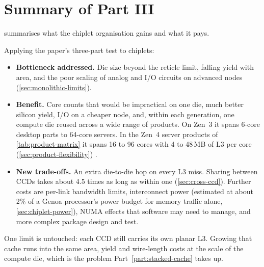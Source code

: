 \section{Summary of Part III}
 summarises what the chiplet organisation gains and what it pays.



Applying the paper's three-part test to chiplets:
\begin{itemize}
  \item \textbf{Bottleneck addressed.} Die size beyond the reticle limit, falling yield with area, and the poor scaling of analog and I/O circuits on advanced nodes (\cref{sec:monolithic-limits}).
  \item \textbf{Benefit.} Core counts that would be impractical on one die, much better silicon yield, I/O on a cheaper node, and, within each generation, one compute die reused across a wide range of products. On Zen~3 it spans 6-core desktop parts to 64-core servers. In the Zen~4 server products of \cref{tab:product-matrix} it spans 16 to 96 cores with 4 to 48\,MB of L3 per core (\cref{sec:product-flexibility}) \cite{naffziger2020chiplet,suggs2019zen2}.
  \item \textbf{New trade-offs.} An extra die-to-die hop on every L3 miss. Sharing between CCDs takes about 4.5 times as long as within one (\cref{sec:cross-ccd}). Further costs are per-link bandwidth limits, interconnect power (estimated at about 2\% of a Genoa processor's power budget for memory traffic alone, \cref{sec:chiplet-power}), NUMA effects that software may need to manage, and more complex package design and test.
\end{itemize}
One limit is untouched: each CCD still carries its own planar L3. Growing that cache runs into the same area, yield and wire-length costs at the scale of the compute die, which is the problem Part~\ref{part:stacked-cache} takes up.
